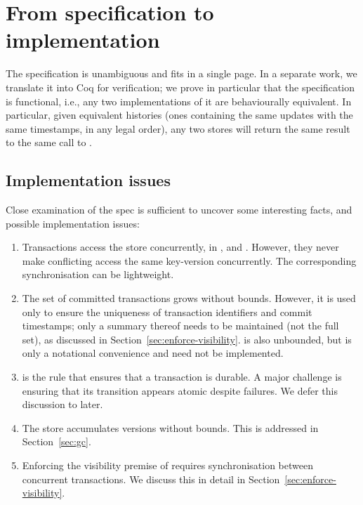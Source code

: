 \section{From specification to implementation}
\label{sec:correctness-challenges}

The specification is unambiguous and fits in a single page.
In a separate work, we translate it into Coq for verification; we prove
in particular that the specification is functional, i.e., any two
implementations of it are behaviourally equivalent.
In particular, given equivalent histories (ones containing the same
updates with the same timestamps, in any legal order), any two
stores will return the same result to the same call to \lookup{}.

\subsection{Implementation issues}
\label{sec:impelementation-issues}

Close examination of the spec is sufficient to uncover some interesting
facts, and possible implementation issues:
\begin{enumerate}%
\item
  Transactions access the store concurrently, in \initkeyrule{},
  \updaterule{} and \commitrule{}.
  However, they never make conflicting access the same key-version
  concurrently.
  The corresponding synchronisation can be lightweight.
\item
  The set of committed transactions \atrsetc{} grows without bounds.
  However, it is used only to ensure the uniqueness of transaction
  identifiers and commit timestamps; only a summary thereof
  needs to be maintained (not the full set),
  as discussed in Section~\ref{sec:enforce-visibility}.
  \atrseta{} is also unbounded, but is only a notational convenience and
  need not be implemented.
\item
  \commitrule{} is the rule that ensures that a transaction is durable.
  A major challenge is ensuring that its transition appears atomic
  despite failures.
  We defer this discussion to later.
\item
  The store accumulates versions without bounds.
  This is addressed in Section~\ref{sec:gc}.
\item
  Enforcing the visibility premise of \starttxnrule{} requires
  synchronisation between concurrent transactions.
  We discuss this in detail in Section~\ref{sec:enforce-visibility}.
\end{enumerate}

